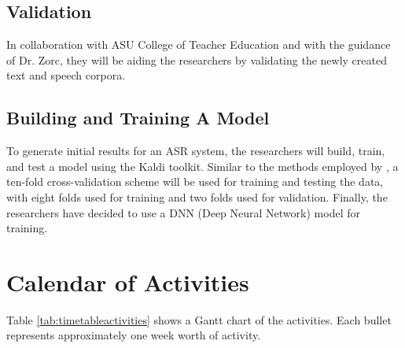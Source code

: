 \subsection{Validation}
In collaboration with ASU College of Teacher Education and with the guidance of Dr. Zorc, they will be aiding the researchers by validating the newly created text and speech corpora.

\subsection{Building and Training A Model}
To generate initial results for an ASR system, the researchers will build, train, and test a model using the Kaldi toolkit. Similar to the methods employed by , a ten-fold cross-validation scheme will be used for training and testing the data, with eight folds used for training and two folds used for validation. Finally, the researchers have decided to use a DNN (Deep Neural Network) model for training.

\section{Calendar of Activities}


Table \ref{tab:timetableactivities} shows a Gantt chart of the activities.  Each bullet represents approximately
one week worth of activity.

%
%
\newcommand{\weekone}{\textbullet}
\newcommand{\weektwo}{\textbullet \textbullet}
\newcommand{\weekthree}{\textbullet \textbullet \textbullet}
\newcommand{\weekfour}{\textbullet \textbullet \textbullet \textbullet}

%
%

